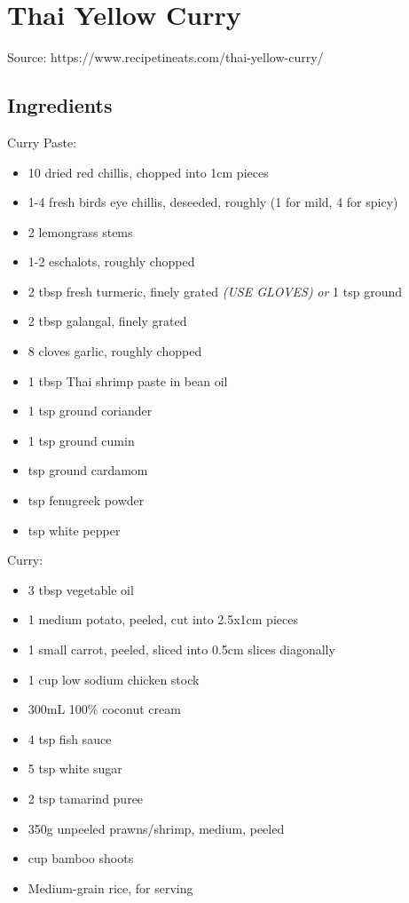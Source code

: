 \section{Thai Yellow Curry}

  
  Source: https://www.recipetineats.com/thai-yellow-curry/
    
  \subsection{Ingredients}
    
  Curry Paste:
  
  \begin{itemize}
    \item 10 dried red chillis, chopped into 1cm pieces
    \item 1-4 fresh birds eye chillis, deseeded, roughly (1 for mild, 4 for spicy)
    \item 2 lemongrass stems
    \item 1-2 eschalots, roughly chopped
    \item 2 tbsp fresh turmeric, finely grated \emph{(USE GLOVES)} \emph{or} 1  tsp ground
    \item 2 tbsp galangal, finely grated
    \item 8 cloves garlic, roughly chopped
    \item 1 tbsp Thai shrimp paste in bean oil
    \item 1 tsp ground coriander
    \item 1 tsp ground cumin
    \item {} tsp ground cardamom
    \item {} tsp fenugreek powder
    \item {} tsp white pepper
  \end{itemize}

  Curry:

  \begin{itemize}
    \item 3 tbsp vegetable oil
    \item 1 medium potato, peeled, cut into 2.5x1cm pieces
    \item 1 small carrot, peeled, sliced into 0.5cm slices diagonally
    \item 1 cup low sodium chicken stock
    \item 300mL 100\% coconut cream
    \item 4 tsp fish sauce
    \item 5 tsp white sugar
    \item 2 tsp tamarind puree
    \item 350g unpeeled prawns/shrimp, medium, peeled
    \item {} cup bamboo shoots
    \item Medium-grain rice, for serving
  \end{itemize}

